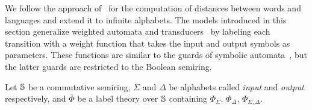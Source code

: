 We follow the approach of~\cite{Mohri03ijfcs} for the computation of distances
between words and languages
and extend it to infinite alphabets.
%
The models introduced in this section generalize
weighted automata and transducers~\cite{Droste09handbook}
by labeling each transition with a weight function
that takes the input and output symbols as parameters.
These functions are similar to the guards of symbolic automata~\cite{dAntoniVeanes17CAV,dAntoni21CACM},
but the latter guards are restricted to the Boolean semiring.
%

\noindent
Let $\mathbb{S}$ be a commutative semiring,
$\Sigma$ and $\Delta$ be alphabets called \emph{input} and \emph{output} respectively, %
and $\bar\Phi$ be a label theory over $\mathbb{S}$
containing $\Phi_\Sigma$, $\Phi_\Delta$, $\Phi_{\Sigma, \Delta}$.

